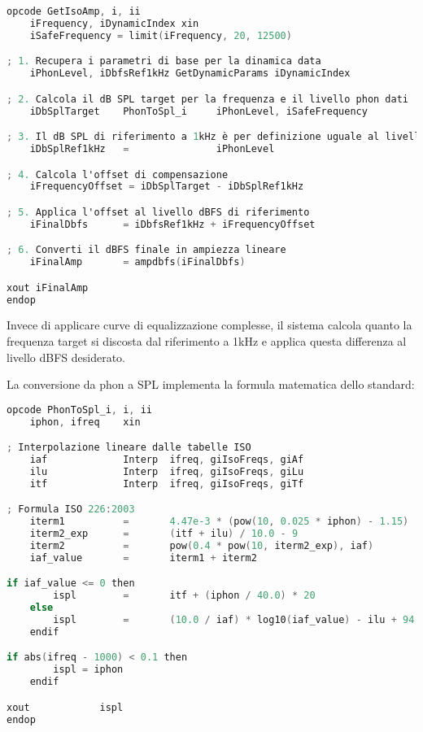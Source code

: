 \begin{lstlisting}[language=C]
opcode GetIsoAmp, i, ii
    iFrequency, iDynamicIndex xin
    iSafeFrequency = limit(iFrequency, 20, 12500)

; 1. Recupera i parametri di base per la dinamica data
    iPhonLevel, iDbfsRef1kHz GetDynamicParams iDynamicIndex

; 2. Calcola il dB SPL target per la frequenza e il livello phon dati
    iDbSplTarget    PhonToSpl_i     iPhonLevel, iSafeFrequency

; 3. Il dB SPL di riferimento a 1kHz è per definizione uguale al livello Phon
    iDbSplRef1kHz   =               iPhonLevel

; 4. Calcola l'offset di compensazione
    iFrequencyOffset = iDbSplTarget - iDbSplRef1kHz

; 5. Applica l'offset al livello dBFS di riferimento
    iFinalDbfs      = iDbfsRef1kHz + iFrequencyOffset

; 6. Converti il dBFS finale in ampiezza lineare
    iFinalAmp       = ampdbfs(iFinalDbfs)

xout iFinalAmp
endop
\end{lstlisting}

Invece di applicare curve di equalizzazione complesse, il sistema calcola quanto la frequenza target si discosta dal riferimento a 1kHz e applica questa differenza al livello dBFS desiderato.

La conversione da phon a SPL implementa la formula matematica dello standard:

\begin{lstlisting}[language=C]
opcode PhonToSpl_i, i, ii
    iphon, ifreq    xin

; Interpolazione lineare dalle tabelle ISO
    iaf             Interp  ifreq, giIsoFreqs, giAf
    ilu             Interp  ifreq, giIsoFreqs, giLu
    itf             Interp  ifreq, giIsoFreqs, giTf

; Formula ISO 226:2003
    iterm1          =       4.47e-3 * (pow(10, 0.025 * iphon) - 1.15)
    iterm2_exp      =       (itf + ilu) / 10.0 - 9
    iterm2          =       pow(0.4 * pow(10, iterm2_exp), iaf)
    iaf_value       =       iterm1 + iterm2

if iaf_value <= 0 then
        ispl        =       itf + (iphon / 40.0) * 20
    else
        ispl        =       (10.0 / iaf) * log10(iaf_value) - ilu + 94.0
    endif

if abs(ifreq - 1000) < 0.1 then
        ispl = iphon
    endif

xout            ispl
endop
\end{lstlisting}

